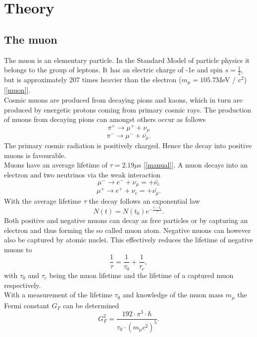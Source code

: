\section{Theory}
\subsection{The muon}
The muon is an elementary particle. In the Standard Model of particle physics it belongs to the group of leptons. It has an electric charge of -1e and spin $s = \frac{1}{2}$, but is approximately 207 times heavier than the electron ($m_{\mu} = 105.7$MeV / c$^2$) [\ref{muon}].\\
Cosmic muons are produced from decaying pions and kaons, which in turn are produced by energetic protons coming from primary cosmic rays. The production of muons from decaying pions can amongst others occur as follows
\begin{equation}
\pi^+ \rightarrow \mu^+ + \nu_{\mu}
\label{piPlus}
\end{equation}
\begin{equation}
\pi^- \rightarrow \mu^- + \bar{\nu_{\mu}}.
\label{piMinus}
\end{equation}
The primary cosmic radiation is positively charged. Hence the decay into positive muons is favourable.\\
Muons have an average lifetime of $\tau = 2.19\mu$s [\ref{manual}]. A muon decays into an electron and two neutrinos via the weak interaction 
\begin{equation}
\mu^- \rightarrow e^- + \nu_{\mu} = + \bar{\nu_{e}}
\end{equation}
\begin{equation}
\mu^+ \rightarrow e^+ + \nu_{e} = + \bar{\nu_{\mu}}.
\end{equation}
With the average lifetime $\tau$ the decay follows an exponential law
\begin{equation}
N(t) = N(t_0) e^{- \frac{t - t_0}{\tau}}.
\end{equation}
Both positive and negative muons can decay as free particles or by capturing an electron and thus forming the so called muon atom. Negative muons can however also be captured by atomic nuclei. This effectively reduces the lifetime of negative muons to
\begin{equation}
\frac{1}{\tau} = \frac{1}{\tau_0} + \frac{1}{\tau_c},
\end{equation}
with $\tau_0$ and $\tau_c$ being the muon lifetime and the lifetime of a captured muon respectively.\\
With a measurement of the lifetime $\tau_0$ and knowledge of the muon mass $m_{\mu}$ the Fermi constant $G_F$ can be determined
\begin{equation}
G_F^2 = \frac{192 \cdot \pi^3 \cdot \hbar}{\tau_0 \cdot (m_{\mu} c^2)^5}.
\end{equation}


